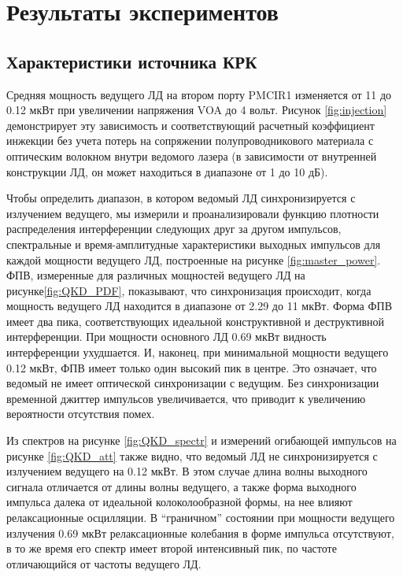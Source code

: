 \section{Результаты экспериментов}
\label{sec:results}

\subsection{Характеристики источника КРК}


Средняя мощность ведущего ЛД на втором порту PMCIR1 изменяется от 11 до 0.12 мкВт при увеличении напряжения VOA до 4 вольт. Рисунок \ref{fig:injection} демонстрирует эту зависимость и соответствующий расчетный коэффициент инжекции без учета потерь на сопряжении полупроводникового материала с оптическим волокном внутри ведомого лазера (в зависимости от внутренней конструкции ЛД, он может находиться в диапазоне от 1 до 10 дБ). 

Чтобы определить диапазон, в котором ведомый ЛД синхронизируется с излучением ведущего, мы измерили и проанализировали функцию плотности распределения интерференции следующих друг за другом импульсов, спектральные и время-амплитудные характеристики выходных импульсов для каждой мощности ведущего ЛД, построенные на рисунке \ref{fig:master_power}. ФПВ, измеренные для различных мощностей ведущего ЛД на рисунке\ref{fig:QKD_PDF}, показывают, что синхронизация происходит, когда мощность ведущего ЛД находится в диапазоне от 2.29 до 11 мкВт. Форма ФПВ имеет два пика, соответствующих идеальной конструктивной и деструктивной интерференции. При мощности основного ЛД 0.69 мкВт видность интерференции ухудшается. И, наконец, при минимальной мощности ведущего 0.12 мкВт, ФПВ имеет только один высокий пик в центре. Это означает, что ведомый не имеет оптической синхронизации с ведущим. Без синхронизации временной джиттер импульсов увеличивается, что приводит к увеличению вероятности отсутствия помех.

Из спектров на рисунке \ref{fig:QKD_spectr} и измерений огибающей импульсов на рисунке \ref{fig:QKD_att} также видно, что ведомый ЛД не синхронизируется с излучением ведущего на 0.12 мкВт. В этом случае длина волны выходного сигнала отличается от длины волны ведущего, а также форма выходного импульса далека от идеальной колоколообразной формы, на нее влияют релаксационные осцилляции. В ``граничном'' состоянии при мощности ведущего излучения 0.69 мкВт релаксационные колебания в форме импульса отсутствуют, в то же время его спектр имеет второй интенсивный пик, по частоте отличающийся от частоты ведущего ЛД.

